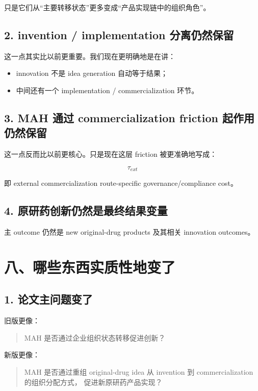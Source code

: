 \documentclass[12pt,fontset=none]{ctexart}
\begin{document}
只是它们从“主要转移状态”更多变成“产品实现链中的组织角色”。

\subsection*{2. invention / implementation 分离仍然保留}

这一点其实比以前更重要。我们现在更明确地是在讲：

\begin{itemize}[leftmargin=2em]
    \item innovation 不是 idea generation 自动等于结果；
    \item 中间还有一个 implementation / commercialization 环节。
\end{itemize}

\subsection*{3. MAH 通过 commercialization friction 起作用仍然保留}

这一点反而比以前更核心。只是现在这层 friction 被更准确地写成：

\[
\tau_{ext}
\]

即 external commercialization route-specific governance/compliance cost。

\subsection*{4. 原研药创新仍然是最终结果变量}

主 outcome 仍然是 new original-drug products 及其相关 innovation outcomes。

\section{八、哪些东西实质性地变了}

\subsection*{1. 论文主问题变了}

旧版更像：

\begin{quote}
MAH 是否通过企业组织状态转移促进创新？
\end{quote}

新版更像：

\begin{quote}
MAH 是否通过重组 original-drug idea 从 invention 到 commercialization 的组织分配方式，
促进新原研药产品实现？
\end{quote}
\end{document}
